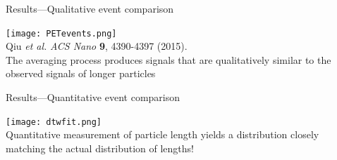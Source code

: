 
\begin{frame}[c]{Results---Qualitative event comparison}
	
	{\centering
		\texttt{[image: PETevents.png]} \\
		{\tiny Qiu \textit{et al.} \textit{ACS Nano} \textbf{9}, 4390-4397 (2015).} \\
		\vspace{.2in}
		\textcolor{negativered}{The averaging process produces signals that are qualitatively similar to the observed signals of longer particles}
		\par
	}
\end{frame}




\begin{frame}[c]{Results---Quantitative event comparison}
	{\centering
		\texttt{[image: dtwfit.png]} \\
		\textcolor{negativered}{Quantitative measurement of particle length yields a distribution closely matching the actual distribution of lengths!}
		\par
	}
\end{frame}




